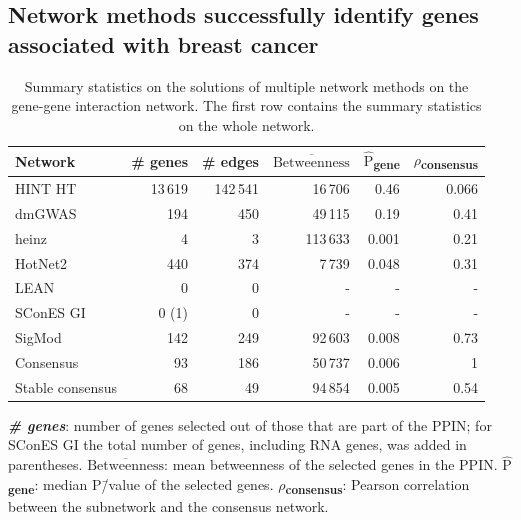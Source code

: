 \documentclass[twocolumn, 11pt]{article}
\newcommand{\mean}[1]{$\overline{\mbox{#1}}$}
\newcommand{\median}[1]{$\hat{\mbox{#1}}$}
\begin{document}
\subsection{Network methods successfully identify genes associated with breast cancer}
\label{results:separate_networks}
\begin{table}[htbp]
  \centering
  \begin{threeparttable}
\caption{Summary statistics on the solutions of multiple network methods on the gene-gene interaction network. The first row contains the summary statistics on the whole network.}
\label{tab:gene_solutions}
\centering
\begin{tabular}{lrrrrr}
Network & \# genes & \# edges & \mean{Betweenness} & \median{P}\textsubscript{gene} & \(\rho\)\textsubscript{consensus}\\
\hline
HINT HT & 13\,619 & 142\,541 & 16\,706 & 0.46 & 0.066\\
\hline
dmGWAS & 194 & 450 & 49\,115 & 0.19 & 0.41\\
heinz & 4 & 3 & 113\,633 & 0.001 & 0.21\\
HotNet2 & 440 & 374 & 7\,739 & 0.048 & 0.31\\
LEAN & 0 & 0 & - & - & -\\
SConES GI & 0 (1) & 0 & - & - & -\\
SigMod & 142 & 249 & 92\,603 & 0.008 & 0.73\\
\hline
Consensus & 93 & 186 & 50\,737 & 0.006 & 1\\
Stable consensus & 68 & 49 & 94\,854 & 0.005 & 0.54 \\
\end{tabular}
\begin{tablenotes}
  \footnotesize{
    \item \textbf{\emph{\# genes}}: number of genes selected out of those that are part of the PPIN; for SConES GI the total number of genes, including RNA genes, was added in parentheses. \textbf{\mean{Betweenness}}: mean betweenness of the selected genes in the PPIN. \textbf{\median{P}\textsubscript{gene}}: median P\=/value of the selected genes. \textbf{\(\rho\)\textsubscript{consensus}}: Pearson correlation between the subnetwork and the consensus network.
  }
\end{tablenotes}
\end{threeparttable}
\end{table}
\end{document}

